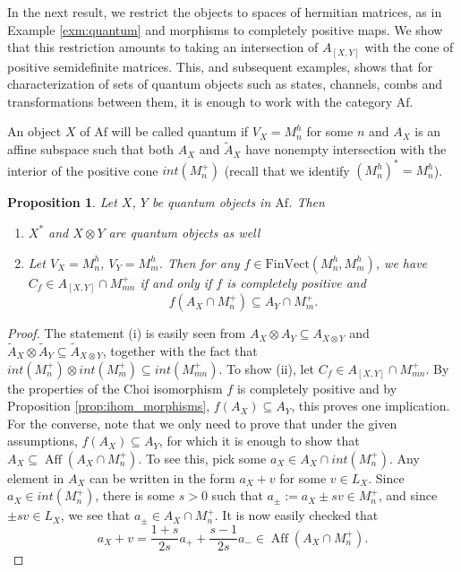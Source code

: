 \documentclass[12pt]{article}
\newtheorem{prop}{Proposition}
\theoremstyle{definition}
\theoremstyle{remark}
\def\aff{\operatorname{Aff}}
\def \Af{\mathrm{Af}}
\def \FV{\mathrm{FinVect}}
\begin{document}
In the next result, we restrict the objects to spaces of hermitian matrices, as in Example
\ref{exm:quantum} and morphisms to completely positive maps. We show that this restriction
amounts to taking an intersection of $A_{[X,Y]}$ with the cone of positive semidefinite
matrices. This, and subsequent examples,  shows that for characterization of sets  of quantum
objects such as states, channels, combs and transformations between them, it is enough to
work with the category $\Af$. 

An object $X$ of $\Af$ will be called quantum if $V_X=M_n^h$ for some $n$ and $A_X$ is an
affine subspace such that both $A_X$ and $\tilde A_X$ have nonempty intersection with the
interior of the positive cone 
$int(M_n^+)$ (recall that we identify $(M_n^h)^*=M_n^h$). 




\begin{prop}\label{prop:ihom_quantum} Let $X$, $Y$ be quantum objects in $\Af$. Then 
\begin{enumerate}
\item[(i)] $X^*$ and $X\otimes Y$ are quantum objects as well
\item[(ii)] Let $V_X=M_n^h$, $V_Y=M_m^h$. Then for any $f\in \FV(M_n^h,M_m^h)$, we have
$C_f\in A_{[X,Y]}\cap M_{mn}^+$ if and only if $f$ is completely positive and
\[
f(A_X\cap M_n^+)\subseteq A_Y\cap M_m^+.
\]
\end{enumerate}


\end{prop}

\begin{proof} The statement (i) is easily seen from  $A_X\otimes A_Y
\subseteq  A_{X\otimes Y}$ and $\tilde A_X\otimes \tilde A_Y\subseteq \tilde A_{X\otimes
Y}$, together with the fact that $int(M_n^+)\otimes int(M_m^+)\subseteq int(M_{mn}^+)$. 
To show (ii), let $C_f\in   A_{[X,Y]}\cap M_{mn}^+$. By the properties of the Choi
isomorphism $f$ is completely positive and by Proposition \ref{prop:ihom_morphisms},
$f(A_X)\subseteq A_Y$, this proves one implication. For the converse, note that we only
need to prove that under the given assumptions, $f(A_X)\subseteq A_Y$, for which it is enough
to show that $A_X\subseteq \aff(A_X\cap M_n^+)$. To see this, pick some  $a_X\in  A_X\cap
int(M_n^+)$. Any element in $A_X$ can be written in the form $a_X+v$ for some $v\in L_X$.
Since $a_X\in int(M_n^+)$, there is some $s>0$ such that $a_\pm:=a_X\pm sv\in M_n^+$, and
since $\pm sv\in L_X$, we see that $a_\pm \in A_X\cap M_n^+$. It is now easily checked
that
\[
a_X+v=\frac{1+s}{2s}a_++\frac{s-1}{2s}a_-\in \aff(A_X\cap M_n^+). 
\]


\end{proof}
\end{document}
